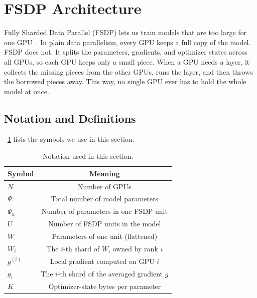 \documentclass[11pt]{article}
\theoremstyle{definition}
\theoremstyle{plain}
\newcommand{\Psiu}{\Psi_u}
\begin{document}
\section{FSDP Architecture}
\label{sec:fsdp}

Fully Sharded Data Parallel (FSDP) lets us train models that are too
large for one GPU~\cite{zhao2023fsdp}. In plain data parallelism, every
GPU keeps a full copy of the model. FSDP does not. It splits the
parameters, gradients, and optimizer states across all GPUs, so each GPU
keeps only a small piece. When a GPU needs a layer, it collects the
missing pieces from the other GPUs, runs the layer, and then throws the
borrowed pieces away. This way, no single GPU ever has to hold the whole
model at once.

\subsection{Notation and Definitions}
\label{sec:notation}

~\ref{tab:notation} lists the symbols we use in this section.

\begin{table}[ht]
  \centering

  \begin{tabular}{lc}
    \toprule
    Symbol & Meaning \\
    \midrule
    $N$          & Number of GPUs  \\
    $\Psi$       & Total number of model parameters \\
    $\Psiu$      & Number of parameters in one FSDP unit \\
    $U$          & Number of FSDP units in the model \\
    $W$          & Parameters of one unit (flattened) \\
    $W_i$        & The $i$-th shard of $W$, owned by rank $i$ \\
    $g^{(i)}$    & Local gradient computed on GPU $i$ \\
    $g_i$        & The $i$-th shard of the averaged gradient $g$ \\
    $K$          & Optimizer-state bytes per parameter \\
    \bottomrule

  \end{tabular}

  \caption{Notation used in this section.}
  \label{tab:notation}
\end{table}
\end{document}
